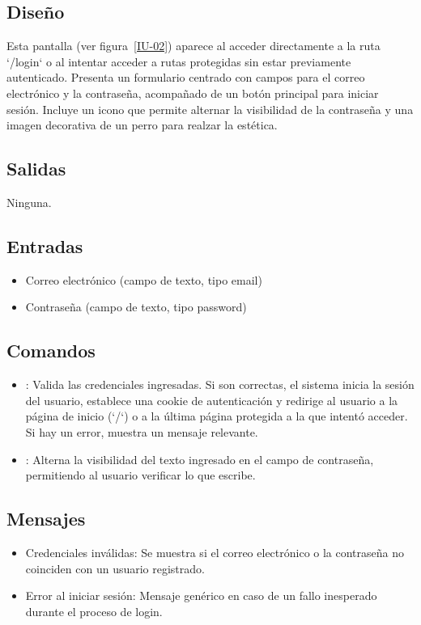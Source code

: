 \subsection{Diseño}
    Esta pantalla  (ver figura~\ref{IU-02}) aparece al acceder directamente a la ruta `/login` o al intentar acceder a rutas protegidas sin estar previamente autenticado. Presenta un formulario centrado con campos para el correo electrónico y la contraseña, acompañado de un botón principal para iniciar sesión. Incluye un icono que permite alternar la visibilidad de la contraseña y una imagen decorativa de un perro para realzar la estética.


\subsection{Salidas}
    Ninguna.

\subsection{Entradas}
\begin{itemize}
    \item Correo electrónico (campo de texto, tipo email)
    \item Contraseña (campo de texto, tipo password)
\end{itemize}

\subsection{Comandos}
\begin{itemize}
    \item {}: Valida las credenciales ingresadas. Si son correctas, el sistema inicia la sesión del usuario, establece una cookie de autenticación y redirige al usuario a la página de inicio (`/`) o a la última página protegida a la que intentó acceder. Si hay un error, muestra un mensaje relevante.
    \item {}: Alterna la visibilidad del texto ingresado en el campo de contraseña, permitiendo al usuario verificar lo que escribe.
\end{itemize}

\subsection{Mensajes}
\begin{itemize}
    \item Credenciales inválidas: Se muestra si el correo electrónico o la contraseña no coinciden con un usuario registrado.
    \item Error al iniciar sesión: Mensaje genérico en caso de un fallo inesperado durante el proceso de login.
\end{itemize}

